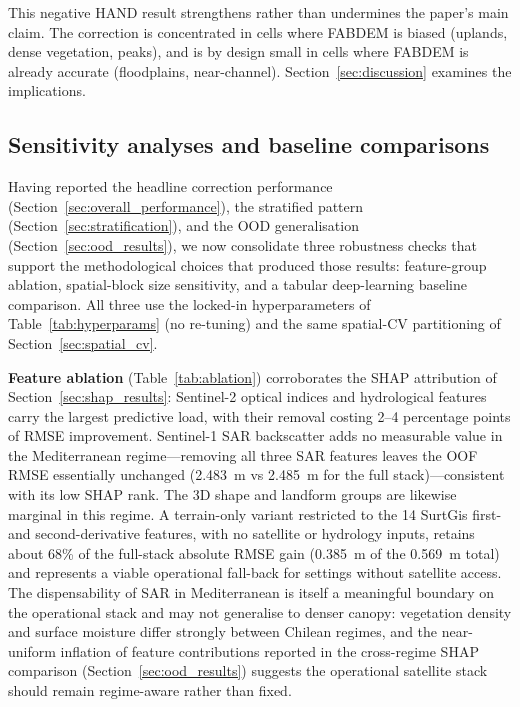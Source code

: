 \documentclass[preprint,authoryear,number]{elsarticle}
\begin{document}
This negative HAND result strengthens rather than undermines the paper's main claim. The correction is concentrated in cells where FABDEM is biased (uplands, dense vegetation, peaks), and is by design small in cells where FABDEM is already accurate (floodplains, near-channel). Section~\ref{sec:discussion} examines the implications.

\subsection{Sensitivity analyses and baseline comparisons}
\label{sec:sensitivity_baselines}

Having reported the headline correction performance (Section~\ref{sec:overall_performance}), the stratified pattern (Section~\ref{sec:stratification}), and the OOD generalisation (Section~\ref{sec:ood_results}), we now consolidate three robustness checks that support the methodological choices that produced those results: feature-group ablation, spatial-block size sensitivity, and a tabular deep-learning baseline comparison. All three use the locked-in hyperparameters of Table~\ref{tab:hyperparams} (no re-tuning) and the same spatial-CV partitioning of Section~\ref{sec:spatial_cv}.

\textbf{Feature ablation} (Table~\ref{tab:ablation}) corroborates the SHAP attribution of Section~\ref{sec:shap_results}: Sentinel-2 optical indices and hydrological features carry the largest predictive load, with their removal costing 2--4 percentage points of RMSE improvement. Sentinel-1 SAR backscatter adds no measurable value in the Mediterranean regime---removing all three SAR features leaves the OOF RMSE essentially unchanged (\SI{2.483}{\meter} vs \SI{2.485}{\meter} for the full stack)---consistent with its low SHAP rank. The 3D shape and landform groups are likewise marginal in this regime. A terrain-only variant restricted to the 14 SurtGis first- and second-derivative features, with no satellite or hydrology inputs, retains about 68\% of the full-stack absolute RMSE gain (\SI{0.385}{\meter} of the \SI{0.569}{\meter} total) and represents a viable operational fall-back for settings without satellite access. The dispensability of SAR in Mediterranean is itself a meaningful boundary on the operational stack and may not generalise to denser canopy: vegetation density and surface moisture differ strongly between Chilean regimes, and the near-uniform inflation of feature contributions reported in the cross-regime SHAP comparison (Section~\ref{sec:ood_results}) suggests the operational satellite stack should remain regime-aware rather than fixed.
\end{document}
